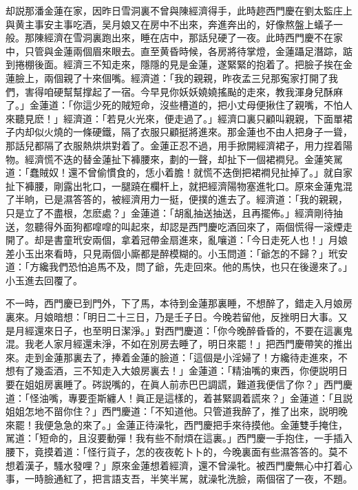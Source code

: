 却説那潘金蓮在家，因昨日雪洞裏不曾與陳經濟得手，此時趂西門慶在劉太監庄上與黄主事安主事吃酒，吴月娘又在房中不出來，奔進奔出的，好像熬盤上蟻子一般。那陳經濟在雪洞裏跑出來，睡在店中，那話兒硬了一夜。此時西門慶不在家中，只管與金蓮兩個眉來眼去。直至黄昏時候，各房將待掌燈，金蓮躡足潛踪，踮到捲棚後面。經濟三不知走來，隱隱的見是金蓮，遂緊緊的抱着了。把臉子挨在金蓮臉上，兩個親了十來個嘴。經濟道：「我的親親，昨夜孟三兒那寃家打開了我們，害得咱硬幫幫撑起了一宿。今早見你妖妖嬈嬈搖颭的走來，教我渾身兒酥麻了。」金蓮道：「你這少死的賊短命，沒些槽道的，把小丈母便揪住了親嘴，不怕人來聽見麽！」經濟道：「若見火光來，便走過了。」經濟口裏只顧叫親親，下面單裙子内却似火燒的一條硬鐵，隔了衣服只顧挺將進來。那金蓮也不由人把身子一聳，那話兒都隔了衣服熱烘烘對着了。金蓮正忍不過，用手掀開經濟裙子，用力捏着陽物。經濟慌不迭的替金蓮扯下褲腰來，劃的一聲，却扯下一個裙襇兒。金蓮笑駡道：「蠢賊奴！還不曾偷慣食的，恁小着膽！就慌不迭倒把裙襇兒扯掉了。」就自家扯下褲腰，剛露出牝口，一腿蹺在欄杆上，就把經濟陽物塞進牝口。原來金蓮鬼混了半晌，已是濕答答的，被經濟用力一挺，便撲的進去了。經濟道：「我的親親，只是立了不盡根，怎麽處？」金蓮道：「胡亂抽送抽送，且再擺佈。」經濟剛待抽送，忽聽得外面狗都噑噑的叫起來，却認是西門慶吃酒回來了，兩個慌得一滚煙走開了。却是書童玳安兩個，拿着冠帶金扇進來，亂嚷道：「今日走死人也！」月娘差小玉出來看時，只見兩個小廝都是醉模糊的。小玉問道：「爺怎的不歸？」玳安道：「方纔我們恐怕追馬不及，問了爺，先走回來。他的馬快，也只在後邊來了。」小玉進去回覆了。

不一時，西門慶已到門外，下了馬，本待到金蓮那裏睡，不想醉了，錯走入月娘房裏來。月娘暗想：「明日二十三日，乃是壬子日。今晚若留他，反挫明日大事。又是月經還來日子，也至明日潔淨。」對西門慶道：「你今晚醉昏昏的，不要在這裏鬼混。我老人家月經還未淨，不如在別房去睡了，明日來罷！」把西門慶帶笑的推出來。走到金蓮那裏去了，捧着金蓮的臉道：「這個是小淫婦了！方纔待走進來，不想有了幾盃酒，三不知走入大娘房裏去！」金蓮道：「精油嘴的東西，你便説明日要在姐姐房裏睡了。硶説嘴的，在眞人前赤巴巴調謊，難道我便信了你？」西門慶道：「怪油嘴，專要歪斯纏人！眞正是這樣的，着甚緊調着謊來？」金蓮道：「且説姐姐怎地不㽞你住？」西門慶道：「不知道他。只管道我醉了，推了出來，説明晚來罷！我便急急的來了。」金蓮正待澡牝，西門慶把手來待摸他。金蓮雙手掩住，駡道：「短命的，且沒要動彈！我有些不耐煩在這裏。」西門慶一手抱住，一手插入腰下，竟摸着道：「怪行貨子，怎的夜夜乾卜卜的，今晚裏面有些濕答答的。莫不想着漢子，騷水發哩？」原來金蓮想着經濟，還不曾澡牝。被西門慶無心中打着心事，一時臉通紅了，把言語支吾，半笑半駡，就澡牝洗臉，兩個宿了一夜，不題。

